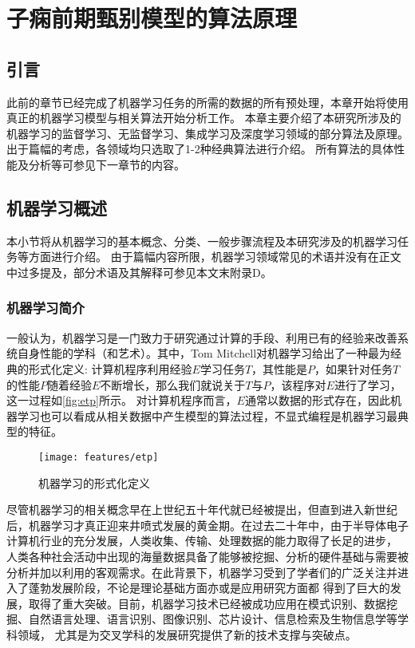 \chapter{子痫前期甄别模型的算法原理}
\section{引言}
此前的章节已经完成了机器学习任务的所需的数据的所有预处理，本章开始将使用真正的机器学习模型与相关算法开始分析工作。
本章主要介绍了本研究所涉及的机器学习的监督学习、无监督学习、集成学习及深度学习领域的部分算法及原理。出于篇幅的考虑，各领域均只选取了1-2种经典算法进行介绍。
所有算法的具体性能及分析等可参见下一章节的内容。

\section{机器学习概述}
本小节将从机器学习的基本概念、分类、一般步骤流程及本研究涉及的机器学习任务等方面进行介绍。
由于篇幅内容所限，机器学习领域常见的术语并没有在正文中过多提及，部分术语及其解释可参见本文末附录D。
\subsection{机器学习简介}
一般认为，机器学习是一门致力于研究通过计算的手段、利用已有的经验来改善系统自身性能的学科（和艺术）\cite{Zhou2016,Aurélien2018}。其中，Tom Mitchell对机器学习给出了一种最为经典的形式化定义:
计算机程序利用经验$E$学习任务$T$，其性能是$P$，如果针对任务$T$的性能$P$随着经验$E$不断增长，那么我们就说关于$T$与$P$，该程序对$E$进行了学习，这一过程如\autoref{fig:etp}所示\cite{mitchell1997,Zhou2016}。
对计算机程序而言，$E$通常以数据的形式存在，因此机器学习也可以看成从相关数据中产生模型的算法过程，不显式编程是机器学习最典型的特征。
\begin{figure}[htbp]
  \centering
  \texttt{[image: features/etp]}
  \caption[机器学习方法的形式化定义]{\label{fig:etp}机器学习的形式化定义}
\end{figure}

尽管机器学习的相关概念早在上世纪五十年代就已经被提出，但直到进入新世纪后，机器学习才真正迎来井喷式发展的黄金期。在过去二十年中，由于半导体电子计算机行业的充分发展，人类收集、传输、处理数据的能力取得了长足的进步，
人类各种社会活动中出现的海量数据具备了能够被挖掘、分析的硬件基础与需要被分析并加以利用的客观需求。在此背景下，机器学习受到了学者们的广泛关注并进入了蓬勃发展阶段，不论是理论基础方面亦或是应用研究方面都
得到了巨大的发展，取得了重大突破。目前，机器学习技术已经被成功应用在模式识别、数据挖掘、自然语言处理、语言识别、图像识别、芯片设计、信息检索及生物信息学等学科领域，
尤其是为交叉学科的发展研究提供了新的技术支撑与突破点\cite{Zhou2016,Aurélien2018,Li2017}。

